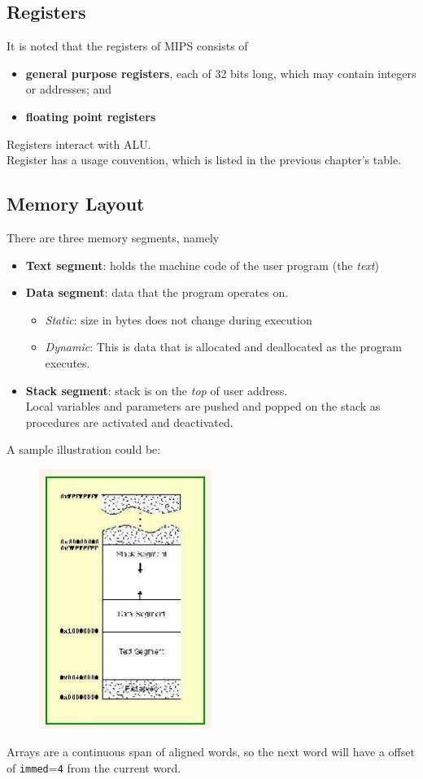 \documentclass[12pt]{article}
\theoremstyle{definition}
\begin{document}
\subsection{Registers}
It is noted that the registers of MIPS consists of
\begin{itemize}
\item \textbf{general purpose registers}, each of 32 bits long, which may contain integers or addresses; and
\item \textbf{floating point registers}
\end{itemize}
Registers interact with ALU.\\
Register has a usage convention, which is listed in the previous chapter's table.
\subsection{Memory Layout}
There are three memory segments, namely
\begin{itemize}
\item \textbf{Text segment}: holds the machine code of the user program (the \textit{text})
\item \textbf{Data segment}: data that the program operates on. 
\begin{itemize}
  \item \textit{Static}: size in bytes does not change during execution
  \item \textit{Dynamic}: This is data that is allocated and deallocated as the program executes.
\end{itemize}
\item \textbf{Stack segment}: stack is on the \textit{top} of user address.\\Local variables and parameters are pushed and popped on the stack as procedures are activated and deactivated.
\end{itemize}
A sample illustration could be:
\clearpage
\begin{figure}[h]
\centering
\includegraphics[width = 0.5\textwidth]{12_1.jpg}
\end{figure}
Arrays are a continuous span of aligned words, so the next word will have a offset of \texttt{immed}=\texttt{4} from the current word. 
\end{document}
